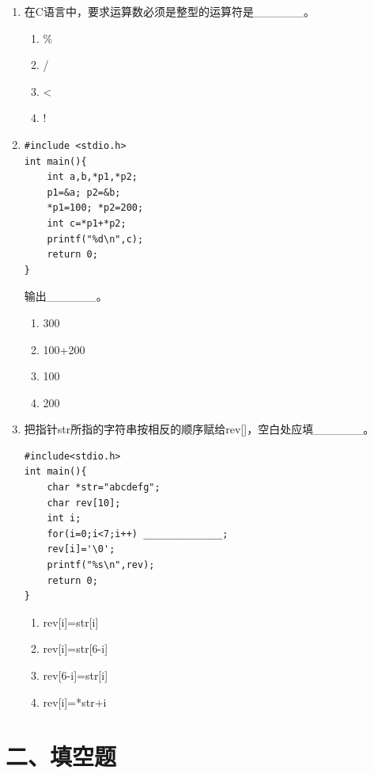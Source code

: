 \documentclass[a4paper,12pt]{article}
\begin{document}
\begin{enumerate}
	\item 在C语言中，要求运算数必须是整型的运算符是\_\_\_\_\_\_。
	      \begin{enumerate}
		      \item[A)] \%
		      \item[B)] /
		      \item[C)] <
		      \item[D)] !
	      \end{enumerate}
	      \vspace{0.3cm}

	\item
	      \begin{verbatim}
#include <stdio.h>
int main(){
    int a,b,*p1,*p2;
    p1=&a; p2=&b;
    *p1=100; *p2=200;
    int c=*p1+*p2;
    printf("%d\n",c);
    return 0;
}
    \end{verbatim}
	      输出\_\_\_\_\_\_。
	      \begin{enumerate}
		      \item[A)] 300
		      \item[B)] 100+200
		      \item[C)] 100
		      \item[D)] 200
	      \end{enumerate}
	      \vspace{0.3cm}

	\item 把指针str所指的字符串按相反的顺序赋给rev[]，空白处应填\_\_\_\_\_\_。
	      \begin{verbatim}
#include<stdio.h>
int main(){
    char *str="abcdefg";
    char rev[10];
    int i;
    for(i=0;i<7;i++) ______________;
    rev[i]='\0';
    printf("%s\n",rev);
    return 0;
}
    \end{verbatim}
	      \begin{enumerate}
		      \item[A)] rev[i]=str[i]
		      \item[B)] rev[i]=str[6-i]
		      \item[C)] rev[6-i]=str[i]
		      \item[D)] rev[i]=*str+i
	      \end{enumerate}
	      \vspace{0.3cm}
\end{enumerate}

\section*{二、填空题}
\end{document}

